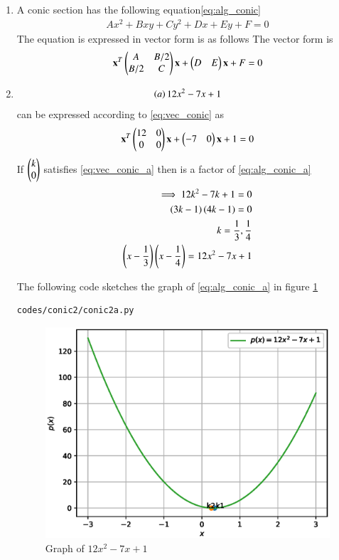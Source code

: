 \renewcommand{\theequation}{\theenumi}
\begin{enumerate}[label=\thesection.\arabic*.,ref=\thesection.\theenumi]

\item A conic section has the following equation\ref{eq:alg_conic}
\begin{align}
Ax^2+Bxy+Cy^2+Dx+Ey+F=0
\label{eq:alg_conic}
\end{align}
The equation is expressed in vector form is as follows
The vector form is 
\begin{align}
\label{eq:vec_conic}
\mathbf{x}^T \begin{pmatrix}A & B/2\\B/2 & C\end{pmatrix}\mathbf{x}+ \begin{pmatrix}D & E\end{pmatrix}\mathbf{x}+F=0
\end{align}

\item 
\begin{align}
\label{eq:alg_conic_a}
\left(a\right) 12x^{2} - 7x + 1
\end{align}
can be expressed according to \ref{eq:vec_conic} as 
\begin{align}
\label{eq:vec_conic_a}
\mathbf{x}^T \begin{pmatrix}12 & 0\\0 & 0\end{pmatrix}\mathbf{x}+ \begin{pmatrix}-7 & 0\end{pmatrix}\mathbf{x}+1=0
\end{align}
If $\begin{pmatrix}k\\0\end{pmatrix}$ satisfies \ref{eq:vec_conic_a} then  is a factor of \ref{eq:alg_conic_a}
\begin{align}
\implies 
12k^{2}-7k+1=0
\\
\left(3k-1\right)\left(4k-1\right)=0
\\
k=\frac{1}{3}, \frac{1}{4}
\\
\left(x-\frac{1}{3}\right)\left(x-\frac{1}{4}\right)=12x^{2} - 7x + 1
\end{align}

The following code sketches the graph of \ref{eq:alg_conic_a} in figure \ref{fig:conic2a}
\begin{lstlisting}
codes/conic2/conic2a.py
\end{lstlisting}
\begin{figure}[!ht]
\centering
\includegraphics[width=\columnwidth]{./codes/conic2/pyfigs/conic2a.eps}
\caption{Graph of $12x^{2} - 7x + 1$}
\label{fig:conic2a}
\end{figure}



\end{enumerate}
